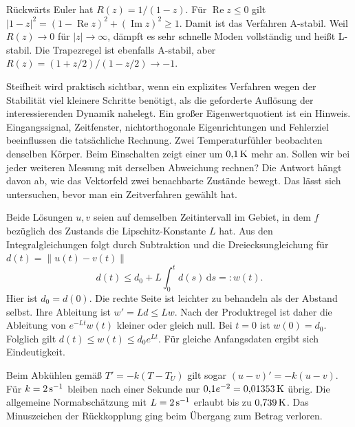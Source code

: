 Rückwärts Euler hat \(R(z)=1/(1-z)\). Für \(\operatorname{Re}z\le0\) gilt \(|1-z|^2=(1-\operatorname{Re}z)^2+(\operatorname{Im}z)^2\ge1\). Damit ist das Verfahren A-stabil. Weil \(R(z)\to0\) für \(|z|\to\infty\), dämpft es sehr schnelle Moden vollständig und heißt L-stabil. Die Trapezregel ist ebenfalls A-stabil, aber \(R(z)=(1+z/2)/(1-z/2)\to-1\).

Steifheit wird praktisch sichtbar, wenn ein explizites Verfahren wegen der Stabilität viel kleinere Schritte benötigt, als die geforderte Auflösung der interessierenden Dynamik nahelegt. Ein großer Eigenwertquotient ist ein Hinweis. Eingangssignal, Zeitfenster, nichtorthogonale Eigenrichtungen und Fehlerziel beeinflussen die tatsächliche Rechnung.
Zwei Temperaturfühler beobachten denselben Körper. Beim Einschalten zeigt einer um \(0{,}1\,\mathrm{K}\) mehr an. Sollen wir bei jeder weiteren Messung mit derselben Abweichung rechnen? Die Antwort hängt davon ab, wie das Vektorfeld zwei benachbarte Zustände bewegt. Das lässt sich untersuchen, bevor man ein Zeitverfahren gewählt hat.

Beide Lösungen \(u,v\) seien auf demselben Zeitintervall im Gebiet, in dem \(f\) bezüglich des Zustands die Lipschitz-Konstante \(L\) hat. Aus den Integralgleichungen folgt durch Subtraktion und die Dreiecksungleichung für \(d(t)=\|u(t)-v(t)\|\)
\[
 d(t)\le d_0+L\int_0^t d(s)\,\mathrm ds=:w(t).
\]
Hier ist \(d_0=d(0)\). Die rechte Seite ist leichter zu behandeln als der Abstand selbst. Ihre Ableitung ist \(w'=Ld\le Lw\). Nach der Produktregel ist daher die Ableitung von \(e^{-Lt}w(t)\) kleiner oder gleich null. Bei \(t=0\) ist \(w(0)=d_0\). Folglich gilt \(d(t)\le w(t)\le d_0e^{Lt}\). Für gleiche Anfangsdaten ergibt sich Eindeutigkeit.

Beim Abkühlen gemäß \(T'=-k(T-T_U)\) gilt sogar \((u-v)'=-k(u-v)\). Für \(k=2\,\mathrm{s^{-1}}\) bleiben nach einer Sekunde nur \(0{,}1e^{-2}=0{,}01353\,\mathrm{K}\) übrig. Die allgemeine Normabschätzung mit \(L=2\,\mathrm{s^{-1}}\) erlaubt bis zu \(0{,}739\,\mathrm{K}\). Das Minuszeichen der Rückkopplung ging beim Übergang zum Betrag verloren.

